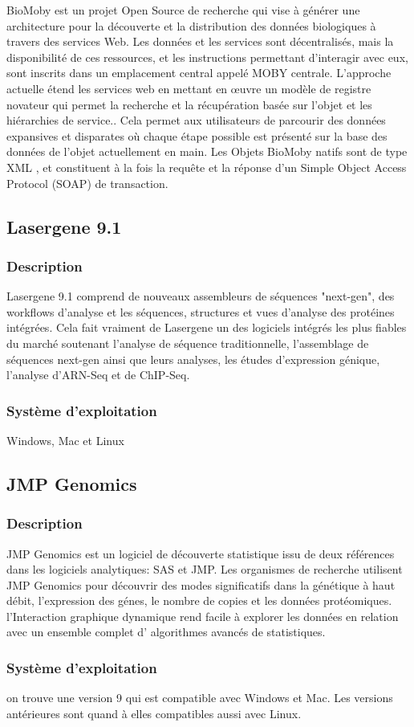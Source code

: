 BioMoby est un projet Open Source de recherche qui vise à générer une architecture pour la découverte et la distribution des données biologiques à travers des services Web. Les données et les services sont décentralisés, mais la disponibilité de ces ressources, et les instructions permettant d'interagir avec eux, sont inscrits dans un emplacement central appelé MOBY centrale.  L'approche actuelle étend les services web en mettant en œuvre un modèle de registre novateur qui permet la recherche et la récupération basée sur l'objet et les hiérarchies de service.. Cela permet aux utilisateurs de parcourir des données expansives et disparates où chaque étape possible est présenté sur la base des données de l'objet actuellement en main. Les Objets BioMoby natifs sont de type XML , et constituent à la fois la requête et la réponse d'un Simple Object Access Protocol (SOAP) de transaction.



\subsection{Lasergene 9.1}
\subsubsection{Description}
Lasergene 9.1 comprend de nouveaux assembleurs de séquences "next-gen", des workflows d'analyse et les séquences, structures et vues d'analyse des protéines intégrées. Cela fait  vraiment de Lasergene un des logiciels  intégrés les plus fiables du marché soutenant l'analyse de séquence traditionnelle, l'assemblage de séquences next-gen ainsi que leurs analyses, les études d'expression génique, l'analyse d'ARN-Seq et de ChIP-Seq.
\subsubsection{Système d'exploitation}
Windows, Mac et Linux
\subsection{JMP Genomics}
\subsubsection{Description}
JMP Genomics est un logiciel de découverte statistique issu de deux références dans les logiciels analytiques: SAS et JMP. Les organismes de recherche utilisent JMP Genomics pour découvrir des modes significatifs dans la génétique à haut débit, l'expression des génes, le nombre de copies et les données protéomiques. l'Interaction graphique dynamique rend facile à explorer les données en relation avec un ensemble complet d' algorithmes avancés de statistiques.

\subsubsection{Système d'exploitation}
on trouve une version 9 qui est compatible avec Windows et Mac. Les versions antérieures sont quand à elles compatibles aussi avec Linux.